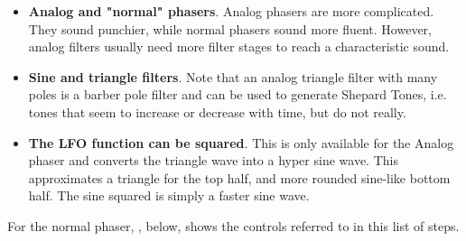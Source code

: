    \begin{itemize}
      \item \textbf{Analog and "normal" phasers}.
      Analog phasers are more complicated.
      They sound punchier, while normal phasers sound more fluent. However,
      analog filters usually need more filter stages to reach a
      characteristic sound.
      \item \textbf{Sine and triangle filters}.
      Note that an analog triangle filter
      with many poles is a barber pole filter and can be used to generate
      Shepard Tones, i.e. tones that seem to increase or decrease with time,
      but do not really.
      \item \textbf{The LFO function can be squared}.
      This is only available for the Analog phaser and converts the triangle
      wave into a hyper sine wave. This approximates a triangle for the top
      half, and more rounded sine-like bottom half. The sine squared is simply
      a faster sine wave.
   \end{itemize}


   For the normal phaser,
   , below, shows the controls referred to
   in this list of steps.

